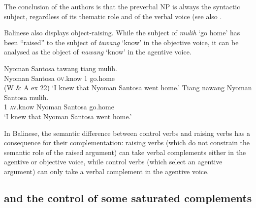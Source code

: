 \documentclass[output=paper
                ,modfonts
                ,nonflat
	        ,collection
	        ,collectionchapter
	        ,collectiontoclongg
 	        ,biblatex
                ,babelshorthands
                ,newtxmath
                ,draftmode
                ,colorlinks, citecolor=brown
]{./langsci/langscibook}
\begin{document}
\eal
{}
\zl

The conclusion of the authors is that the preverbal NP is always the syntactic subject, regardless of its thematic role and of the verbal voice (see also \citealt{ManningandSag1998}.

Balinese also displays object-raising. While the subject of \emph{mulih} `go home' has been ``raised'' to the
subject of \emph{tawang} `know' in the objective voice, it can be analysed as the object of \emph{nawang} `know' in the agentive
voice.

\begin{exe}
\ex \begin{xlist}
\ex 
\gll Nyoman Santosa tawang           tiang  mulih.\\
     Nyoman Santosa \textsc{ov}.know 1      go.home\\\hfill(W \& A ex 22)
\glt `I knew that Nyoman Santosa went home.'
\ex 
\gll Tiang nawang           Nyoman Santosa mulih.\\
     1     \textsc{av}.know Nyoman Santosa go.home\\
\glt `I knew that Nyoman Santosa went home.'
\end{xlist}
\end{exe}

In Balinese, the semantic difference between control verbs and raising verbs has a consequence for their complementation: raising verbs (which do not constrain the semantic role of the raised argument) can take verbal complements either in the agentive or objective voice, while control verbs (which select an agentive argument) can only take a verbal complement in the agentive voice.

\subsection{\xarg and the control of some saturated complements}
\end{document}
